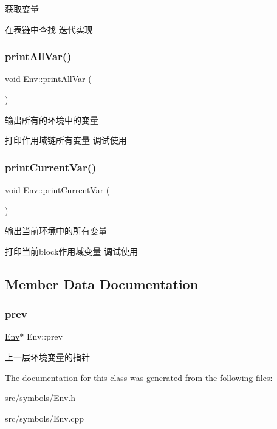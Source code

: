 获取变量 

在表链中查找 迭代实现 \mbox{\label{class_env_a8ba6704ef2039c2329569efc99f1e087}} 
\subsubsection{\texorpdfstring{print\+All\+Var()}{printAllVar()}}
{\footnotesize\ttfamily void Env\+::print\+All\+Var (\begin{DoxyParamCaption}{ }\end{DoxyParamCaption})}



输出所有的环境中的变量 

打印作用域链所有变量 调试使用 \mbox{\label{class_env_a398c166330482abb7e38c546bc3974cf}} 
\subsubsection{\texorpdfstring{print\+Current\+Var()}{printCurrentVar()}}
{\footnotesize\ttfamily void Env\+::print\+Current\+Var (\begin{DoxyParamCaption}{ }\end{DoxyParamCaption})}



输出当前环境中的所有变量 

打印当前block作用域变量 调试使用 

\subsection{Member Data Documentation}
\mbox{\label{class_env_a79a41e9166e949e4c1320ffe3750cb29}} 
\subsubsection{\texorpdfstring{prev}{prev}}
{\footnotesize\ttfamily \hyperlink{class_env}{Env}$\ast$ Env\+::prev\hspace{0.3cm}{\ttfamily [protected]}}

上一层环境变量的指针 

The documentation for this class was generated from the following files\+:\begin{DoxyCompactItemize}
\item 
src/symbols/Env.\+h\item 
src/symbols/Env.\+cpp\end{DoxyCompactItemize}
